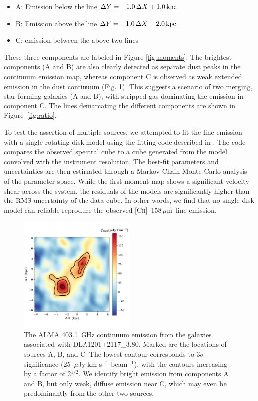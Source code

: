 \documentclass[twocolumn]{aastex62}
\newcommand{\cplus}{[\ctwo]~158\,$\mu$m}
\newcommand{\aslope}{-1.0}    %
\newcommand{\ayoff}{+1.0\,kpc}     %
\newcommand{\bslope}{-1.0}    %
\newcommand{\byoff}{-2.0\,kpc}     %
\newcommand{\ctwo}{C\textsc{ii}}
\begin{document}
\begin{itemize}
  \item A: Emission below the line $\Delta Y = \aslope \,\Delta X \rm \ayoff$
  \item B: Emission above the line $\Delta Y = \bslope \,\Delta X \rm \byoff$
  \item C: emission between the above two lines 
\end{itemize}
These three components are labeled in Figure \ref{fig:moments}. The brightest components (A and B) are also clearly detected as separate dust peaks in the continuum emission map, whereas component C is observed as weak extended emission in the dust continuum (Fig. \ref{fig:dust}). This suggests a scenario of two merging, star-forming galaxies (A and B), with stripped gas dominating the emission in component C. The lines demarcating the different components are shown in Figure~\ref{fig:ratio}.

To test the assertion of multiple sources, we attempted to fit the line emission with 
a single rotating-disk model using the fitting code described in \cite{neeleman+20}. 
The code compares the observed spectral cube to a cube generated from the model convolved with the instrument resolution. The best-fit parameters and uncertainties are then estimated through a Markov Chain Monte 
Carlo analysis of the parameter space. While the first-moment map shows a significant 
velocity shear across the system, the residuals of the models are significantly higher 
than the RMS uncertainty of the data cube. In other words, we find that no single-disk 
model can reliable reproduce the observed \cplus\ line-emission. 


\begin{figure}
\centering
\includegraphics[width=0.5\textwidth]{fig_dust.pdf}
\vspace{-0.3in}
\caption{The ALMA 403.1~GHz continuum emission from the galaxies associated with DLA1201+2117\_3.80.  Marked are the locations of sources A, B, and C.  
The lowest contour corresponds to $3\sigma$ significance 
(25~$\mu$Jy km s$^{-1}$ beam$^{-1}$), with the contours increasing by a factor 
of 2$^{1/2}$. 
We identify bright emission from
components A and B, but only weak, diffuse emission near C, which may even be predominantly 
from the other two sources.
}
\label{fig:dust}
\end{figure}
%
\end{document}
